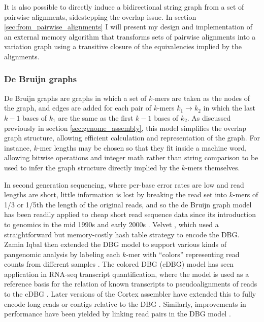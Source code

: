 It is also possible to directly induce a bidirectional string graph from a set of pairwise alignments, sidestepping the overlap issue.
In section \ref{sec:from_pairwise_alignments} I will present my design and implementation of an external memory algorithm that transforms sets of pairwise alignments into a variation graph using a transitive closure of the equivalencies implied by the alignments.

\subsubsection{De Bruijn graphs}
\label{sec:de_bruijn_graphs}

De Bruijn graphs \cite{de1946combinatorial} are graphs in which a set of $k$-mers are taken as the nodes of the graph, and edges are added for each pair of $k$-mers $k_1 \rightarrow k_2$ in which the last $k-1$ bases of $k_1$ are the same as the first $k-1$ bases of $k_2$.
As discussed previously in section \ref{sec:genome_assembly}, this model simplifies the overlap graph structure, allowing efficient calculation and representation of the graph.
For instance, $k$-mer lengths may be chosen so that they fit inside a machine word, allowing bitwise operations and integer math rather than string comparison to be used to infer the graph structure directly implied by the $k$-mers themselves.

In second generation sequencing, where per-base error rates are low and read lengths are short, little information is lost by breaking the read set into $k$-mers of 1/3 or 1/5th the length of the original reads, and so the de Bruijn graph model has been readily applied to cheap short read sequence data since its introduction to genomics in the mid 1990s and early 2000s \cite{idury1995new,pevzner2001eulerian}.
Velvet \cite{zerbino2008velvet}, which used a straightforward but memory-costly hash table strategy to encode the DBG.
Zamin Iqbal then extended the DBG model to support various kinds of pangenomic analysis by labeling each $k$-mer with ``colors'' representing read counts from different samples \cite{iqbal2012novo}.
The colored DBG (cDBG) model has seen application in RNA-seq transcript quantification, where the model is used as a reference basis for the relation of known transcripts to pseudoalignments of reads to the cDBG \cite{bray2016near}.
Later versions of the Cortex assembler have extended this to fully encode long reads or contigs relative to the DBG \cite{turner2018integrating}.
Similarly, improvements in performance have been yielded by linking read pairs in the DBG model \cite{bankevich2012spades}.

